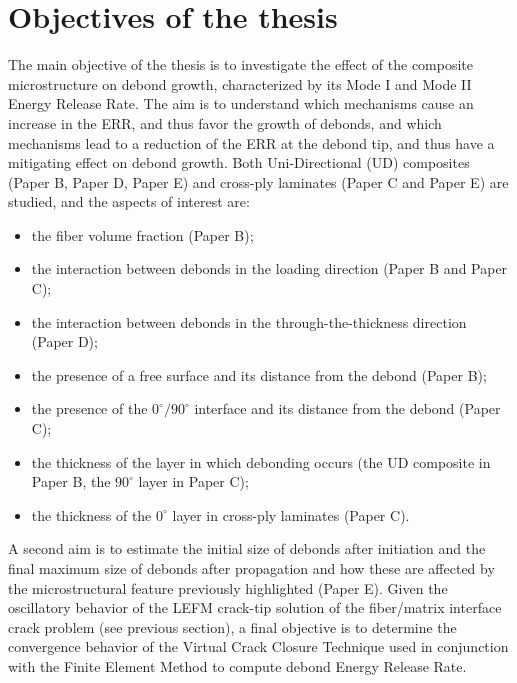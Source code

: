 \section{Objectives of the thesis}

The main objective of the thesis is to investigate the effect of the composite microstructure on debond growth, characterized by its Mode I and Mode II Energy Release Rate. The aim is to understand which mechanisms cause an increase in the ERR, and thus favor the growth of debonds, and which mechanisms lead to a reduction of the ERR at the debond tip, and thus have a mitigating effect on debond growth. Both Uni-Directional (UD) composites (Paper B, Paper D, Paper E) and cross-ply laminates (Paper C and Paper E) are studied, and the aspects of interest are:

\begin{itemize}
\item the fiber volume fraction (Paper B);
\item the interaction between debonds in the loading direction (Paper B and Paper C);
\item the interaction between debonds in the through-the-thickness direction (Paper D);
\item the presence of a free surface and its distance from the debond (Paper B);
\item the presence of the $0^{\circ}/90^{\circ}$ interface and its distance from the debond (Paper C);
\item the thickness of the layer in which debonding occurs (the UD composite in Paper B, the $90^{\circ}$ layer in Paper C);
\item the thickness of the $0^{\circ}$ layer in cross-ply laminates (Paper C).
\end{itemize}

A second aim is to estimate the initial size of debonds after initiation and the final maximum size of debonds after propagation and how these are affected by the microstructural feature previously highlighted (Paper E). Given the oscillatory behavior of the LEFM crack-tip solution of the fiber/matrix interface crack problem (see previous section), a final objective is to determine the convergence behavior of the Virtual Crack Closure Technique used in conjunction with the Finite Element Method to compute debond Energy Release Rate.
